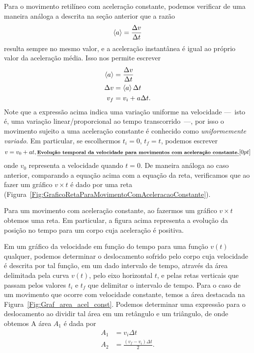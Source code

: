 Para o movimento retilíneo com aceleração constante, podemos verificar de uma maneira análoga a descrita na seção anterior que a razão
\begin{equation}
    \left\langle{a}\right\rangle = \frac{\Delta v}{\Delta t}
\end{equation}
%
resulta sempre no mesmo valor, e a aceleração instantânea é igual ao próprio valor da aceleração média. Isso nos permite escrever
\begin{align}
    \left\langle{a}\right\rangle &= \frac{\Delta v}{\Delta t} \\
    \Delta v &= \left\langle{a}\right\rangle \Delta t \\
    v_f &= v_i + a \Delta t.
\end{align}
%
Note que a expressão acima indica uma variação uniforme na velocidade ---~isto é, uma variação linear/proporcional ao tempo transcorrido~---, por isso o movimento sujeito a uma aceleração constante é conhecido como \emph{uniformemente variado}. Em particular, se escolhermos $t_i = 0$, $t_f = t$, podemos escrever
\begin{equation}
    v = v_0 + at, \relax{\footnotesize\emph{\textbf{Evolução temporal da velocidade para movimentos com aceleração constante.}}}[0pt]
\end{equation}
%
onde $v_0$ representa a velocidade quando $t = 0$. De maneira análoga ao caso anterior, comparando a equação acima com a equação da reta, verificamos que ao fazer um gráfico $v \times t$ é dado por uma reta (Figura~\ref{Fig:GraficoRetaParaMovimentoComAceleracaoConstante}).
\begin{marginfigure}[3cm]
\centering
{}
\caption{Para um movimento com aceleração constante, ao fazermos um gráfico $v \times t$ obtemos uma reta. Em particular, a figura acima representa a evolução da posição no tempo para um corpo cuja aceleração é positiva.\label{Fig:GraficoRetaParaMovimentoComAceleracaoConstante}}
\end{marginfigure}

Em um gráfico da velocidade em função do tempo para uma função $v(t)$ qualquer, podemos determinar o deslocamento sofrido pelo corpo cuja velocidade é descrita por tal função, em um dado intervalo de tempo, através da área delimitada pela curva $v(t)$, pelo eixo horizontal $t$, e pelas retas verticais que passam pelos valores $t_i$ e $t_f$ que delimitar o intervalo de tempo. Para o caso de um movimento que ocorre com velocidade constante, temos a área destacada na Figura~\ref{Fig:Graf_area_acel_const}. Podemos determinar uma expressão para o deslocamento ao dividir tal área em um retângulo e um triângulo, de onde obtemos
A área $A_1$ é dada por
\begin{align}
	A_1 &= v_i \Delta t \\
	A_2 &= \frac{(v_f - v_i)\Delta t}{2}.
\end{align}

